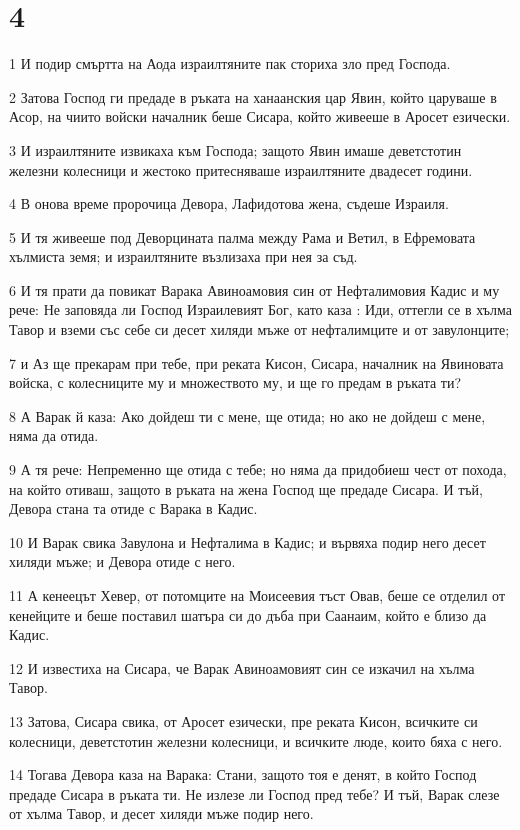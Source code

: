 \chapter{4}

\par 1 И подир смъртта на Аода израилтяните пак сториха зло пред Господа.
\par 2 Затова Господ ги предаде в ръката на ханаанския цар Явин, който царуваше в Асор, на чиито войски началник беше Сисара, който живееше в Аросет езически.
\par 3 И израилтяните извикаха към Господа; защото Явин имаше деветстотин железни колесници и жестоко притесняваше израилтяните двадесет години.
\par 4 В онова време пророчица Девора, Лафидотова жена, съдеше Израиля.
\par 5 И тя живееше под Деворцината палма между Рама и Ветил, в Ефремовата хълмиста земя; и израилтяните възлизаха при нея за съд.
\par 6 И тя прати да повикат Варака Авиноамовия син от Нефталимовия Кадис и му рече: Не заповяда ли Господ Израилевият Бог, като каза : Иди, оттегли се в хълма Тавор и вземи със себе си десет хиляди мъже от нефталимците и от завулонците;
\par 7 и Аз ще прекарам при тебе, при реката Кисон, Сисара, началник на Явиновата войска, с колесниците му и множеството му, и ще го предам в ръката ти?
\par 8 А Варак й каза: Ако дойдеш ти с мене, ще отида; но ако не дойдеш с мене, няма да отида.
\par 9 А тя рече: Непременно ще отида с тебе; но няма да придобиеш чест от похода, на който отиваш, защото в ръката на жена Господ ще предаде Сисара. И тъй, Девора стана та отиде с Варака в Кадис.
\par 10 И Варак свика Завулона и Нефталима в Кадис; и вървяха подир него десет хиляди мъже; и Девора отиде с него.
\par 11 А кенеецът Хевер, от потомците на Моисеевия тъст Овав, беше се отделил от кенейците и беше поставил шатъра си до дъба при Саанаим, който е близо да Кадис.
\par 12 И известиха на Сисара, че Варак Авиноамовият син се изкачил на хълма Тавор.
\par 13 Затова, Сисара свика, от Аросет езически, пре реката Кисон, всичките си колесници, деветстотин железни колесници, и всичките люде, които бяха с него.
\par 14 Тогава Девора каза на Варака: Стани, защото тоя е денят, в който Господ предаде Сисара в ръката ти. Не излезе ли Господ пред тебе? И тъй, Варак слезе от хълма Тавор, и десет хиляди мъже подир него.
